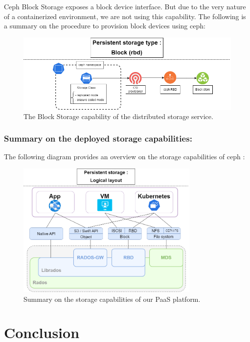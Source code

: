\hspace{7mm}Ceph Block Storage exposes a block device interface. But due to the very nature of a containerized environment, we are not using this capability. The following is a summary on the procedure to provision block devices using ceph: 

\begin{figure}[H]\centering
\includegraphics[width=1.0\textwidth,angle=00]{assets/f33.png}
\caption{The Block Storage capability of the distributed storage service.}
\label{fig:Block Storage Procedure}
\end{figure}

\subsubsection{Summary on the deployed storage capabilities: }

\hspace{7mm}The following diagram provides an overview on the storage capabilities of ceph : 
\begin{figure}[H]\centering
\includegraphics[width=0.8\textwidth,angle=00]{assets/f30.png}
\caption{Summary on the storage capabilities of our PaaS platform.}
\label{fig:f30}
\end{figure}
\section*{Conclusion}

